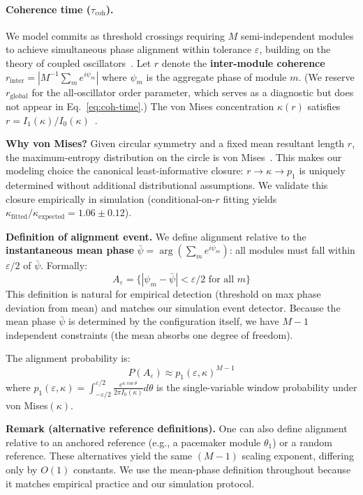 \documentclass[12pt]{article}
\begin{document}
\paragraph{Coherence time ($\tau_{\mathrm{coh}}$).}
We model commits as threshold crossings requiring $M$ semi-independent modules to achieve simultaneous phase alignment within tolerance $\varepsilon$, building on the theory of coupled oscillators~\cite{kuramoto1984,acebron2005}.
Let $r$ denote the \textbf{inter-module coherence} $r_{\mathrm{inter}} = |M^{-1}\sum_m e^{i\psi_m}|$ where $\psi_m$ is the aggregate phase of module $m$. (We reserve $r_{\mathrm{global}}$ for the all-oscillator order parameter, which serves as a diagnostic but does not appear in Eq.~\ref{eq:coh-time}.) The von Mises concentration $\kappa(r)$ satisfies $r=I_1(\kappa)/I_0(\kappa)$~\cite{mardia2000}.

\textbf{Why von Mises?} Given circular symmetry and a fixed mean resultant length $r$, the maximum-entropy distribution on the circle is von Mises~\cite{mardia2000}. This makes our modeling choice the canonical least-informative closure: $r \to \kappa \to p_1$ is uniquely determined without additional distributional assumptions. We validate this closure empirically in simulation (conditional-on-$r$ fitting yields $\kappa_{\mathrm{fitted}}/\kappa_{\mathrm{expected}} = 1.06 \pm 0.12$).

\textbf{Definition of alignment event.} We define alignment relative to the \textbf{instantaneous mean phase} $\bar{\psi} = \arg(\sum_m e^{i\psi_m})$: all modules must fall within $\varepsilon/2$ of $\bar{\psi}$. Formally:
\[
A_\varepsilon = \{|\psi_m - \bar{\psi}| < \varepsilon/2 \text{ for all } m\}
\]
This definition is natural for empirical detection (threshold on max phase deviation from mean) and matches our simulation event detector. Because the mean phase $\bar{\psi}$ is determined by the configuration itself, we have $M-1$ independent constraints (the mean absorbs one degree of freedom).

The alignment probability is:
\[
P(A_\varepsilon) \approx p_1(\varepsilon, \kappa)^{M-1}
\]
where $p_1(\varepsilon, \kappa) = \int_{-\varepsilon/2}^{\varepsilon/2} \frac{e^{\kappa\cos\theta}}{2\pi I_0(\kappa)} d\theta$ is the single-variable window probability under von Mises$(\kappa)$.

\textbf{Remark (alternative reference definitions).} One can also define alignment relative to an anchored reference (e.g., a pacemaker module $\theta_1$) or a random reference. These alternatives yield the same $(M-1)$ scaling exponent, differing only by $O(1)$ constants. We use the mean-phase definition throughout because it matches empirical practice and our simulation protocol.
\end{document}
